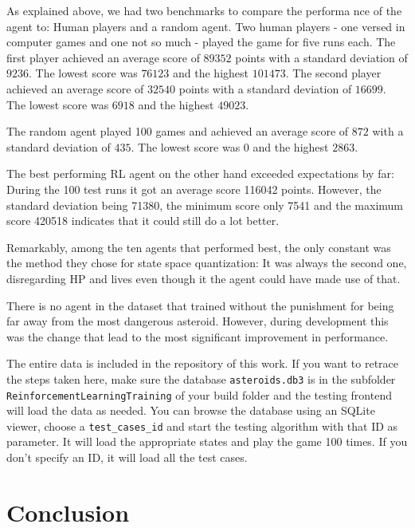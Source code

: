 \documentclass[a4paper,10pt]{article}
\begin{document}

As explained above, we had two benchmarks to compare the performa nce of the agent to: Human players and a random agent.
Two human players - one versed in computer games and one not so much - played the game for five runs each.
The first player achieved an average score of $89352$ points with a standard deviation of $9236$. The lowest score was $76123$ and the highest $101473$.
The second player achieved an average score of $32540$ points with a standard deviation of $16699$. The lowest score was $6918$ and the highest $49023$.

The random agent played 100 games and achieved an average score of $872$ with a standard deviation of $435$. The lowest score was $0$ and the highest $2863$.

The best performing RL agent on the other hand exceeded expectations by far: During the 100 test runs it got an average score 116042 points.
However, the standard deviation being 71380, the minimum score only 7541 and the maximum score 420518 indicates that it could still do a lot better.

Remarkably, among the ten agents that performed best, the only constant was the method they chose for state space quantization: It was always the second one, disregarding HP and lives even though it the agent could have made use of that.

There is no agent in the dataset that trained without the punishment for being far away from the most dangerous asteroid. 
However, during development this was the change that lead to the most significant improvement in performance.

The entire data is included in the repository of this work. If you want to retrace the steps taken here, make sure the database \texttt{asteroids.db3} is in the subfolder \texttt{ReinforcementLearningTraining} of your build folder and the testing frontend will load the data as needed.
You can browse the database using an SQLite viewer, choose a \texttt{test\_cases\_id} and start the testing algorithm with that ID as parameter.
It will load the appropriate states and play the game 100 times. If you don't specify an ID, it will load all the test cases.

\section{Conclusion}
\end{document}
